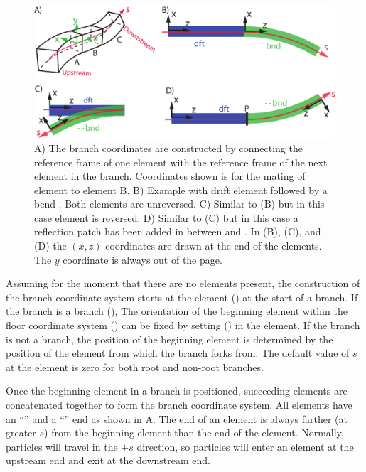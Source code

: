 \begin{figure}[tb]
  \centering
  \includegraphics[width=5in]{patch-between.pdf}
  \caption[Branch coordinates construction.]{A) The branch coordinates are constructed by
connecting the  reference frame of one element with the  reference frame
of the next element in the branch. Coordinates shown is for the mating of element  to element
{B}.  B) Example with drift element  followed by a bend . Both elements are
unreversed. C) Similar to (B) but in this case element  is reversed.  D) Similar to (C) but
in this case a reflection patch has been added in between  and .  In (B), (C), and
(D) the $(x,z)$ coordinates are drawn at the  end of the elements. The $y$ coordinate
is always out of the page.}
  \label{f:patch.between}
\end{figure}

Assuming for the moment that there are no  elements present, the construction of the
branch coordinate system starts at the  element () at the start of a
branch. If the branch is a  branch (), The orientation of the beginning
element within the floor coordinate system () can be fixed by setting 
 () in the  element.
If the branch is not a  branch, the position
of the beginning element is determined by the position of the  element
from which the branch forks from. The default value of $s$ at the  element is zero
for both root and non-root branches.

Once the beginning element in a branch is positioned, succeeding elements are concatenated together
to form the branch coordinate system. All elements have an ``'' and a ``''
end as shown in A. The  end of an element is always farther (at
greater $s$) from the beginning element than the  end of the element. Normally,
particles will travel
in the $+s$ direction, so particles will enter an element at the upstream end and exit at the
downstream end.


